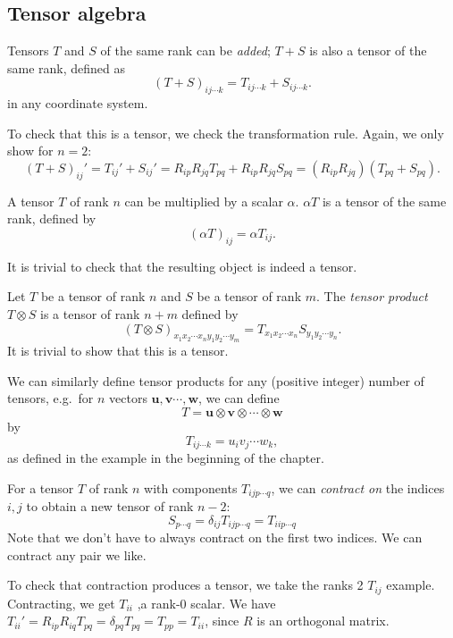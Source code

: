 \documentclass[a4paper]{article}
\begin{document}
\subsection{Tensor algebra}
\begin{defi}
  Tensors $T$ and $S$ of the same rank can be \emph{added}; $T + S$ is also a tensor of the same rank, defined as
  \[
    (T + S)_{ij\cdots k} = T_{ij \cdots k} + S_{ij\cdots k}.
  \]
  in any coordinate system.
\end{defi}
To check that this is a tensor, we check the transformation rule. Again, we only show for $n = 2$:
\[
  (T + S)_{ij}' = T_{ij}' + S_{ij}' = R_{ip}R_{jq}T_{pq} + R_{ip}R_{jq}S_{pq} = (R_{ip}R_{jq})(T_{pq} + S_{pq}).
\]
\begin{defi}
  A tensor $T$ of rank $n$ can be multiplied by a scalar $\alpha$. $\alpha T$ is a tensor of the same rank, defined by
  \[
    (\alpha T)_{ij} = \alpha T_{ij}.
  \]
\end{defi}
It is trivial to check that the resulting object is indeed a tensor.

\begin{defi}
  Let $T$ be a tensor of rank $n$ and $S$ be a tensor of rank $m$. The \emph{tensor product} $T\otimes S$ is a tensor of rank $n + m$ defined by
  \[
    (T \otimes S)_{x_1 x_2\cdots x_n y_1y_2\cdots y_m} = T_{x_1x_2\cdots x_n}S_{y_1y_2\cdots y_n}.
  \]
  It is trivial to show that this is a tensor.

  We can similarly define tensor products for any (positive integer) number of tensors, e.g.\ for $n$ vectors $\mathbf{u}, \mathbf{v} \cdots, \mathbf{w}$, we can define
  \[
    T = \mathbf{u}\otimes \mathbf{v}\otimes \cdots \otimes \mathbf{w}
  \]
  by
  \[
    T_{ij\cdots k} = u_i v_j \cdots w_k,
  \]
  as defined in the example in the beginning of the chapter.
\end{defi}

\begin{defi}
  For a tensor $T$ of rank $n$ with components $T_{ijp\cdots q}$, we can \emph{contract on} the indices $i, j$ to obtain a new tensor of rank $n - 2$:
  \[
    S_{p\cdots q} = \delta_{ij}T_{ij p\cdots q} = T_{iip\cdots q}
  \]
  Note that we don't have to always contract on the first two indices. We can contract any pair we like.
\end{defi}
To check that contraction produces a tensor, we take the ranks 2 $T_{ij}$ example. Contracting, we get $T_{ii}$ ,a rank-0 scalar. We have $T_{ii}' = R_{ip}R_{iq}T_{pq} = \delta_{pq}T_{pq} = T_{pp} = T_{ii}$, since $R$ is an orthogonal matrix.
\end{document}
